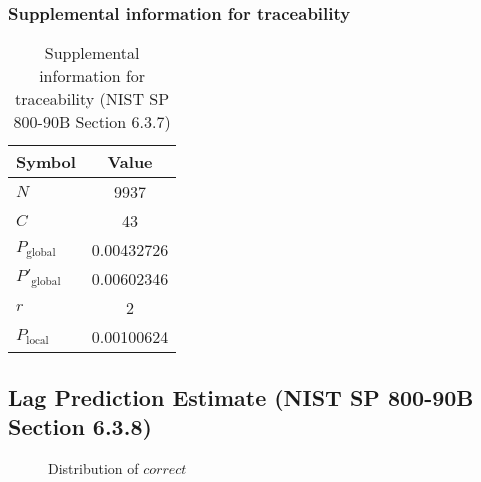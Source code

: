 \documentclass[a3paper,xelatex,english]{bxjsarticle}
\begin{document}
\subsubsection{Supplemental information for traceability}
\renewcommand{\arraystretch}{1.8}
\begin{table}[h]
\caption{Supplemental information for traceability (NIST SP 800-90B Section 6.3.7)}
\begin{center}
\begin{tabular}{|l|c|}
\hline 
\rowcolor{anotherlightblue} %
Symbol				& Value \\ \hline 
$N$				& 9937\\ \hline 
$C$				& 43\\ \hline 
$P_{\textrm{global}}$				& 0.00432726\\ \hline 
$P'_{\textrm{global}}$			& 0.00602346\\ \hline 
$r$				& 2\\ \hline 
$P_{\textrm{local}}$ 			& 0.00100624\\ \hline
\end{tabular}
\end{center}
\end{table}
\renewcommand{\arraystretch}{1.4}
\clearpage
\subsection{Lag Prediction Estimate (NIST SP 800-90B Section 6.3.8)}\label{sec:NonBinary638}

\begin{figure}[htbp]
\centering

\caption{Distribution of $correct$}
\end{figure}
\end{document}
